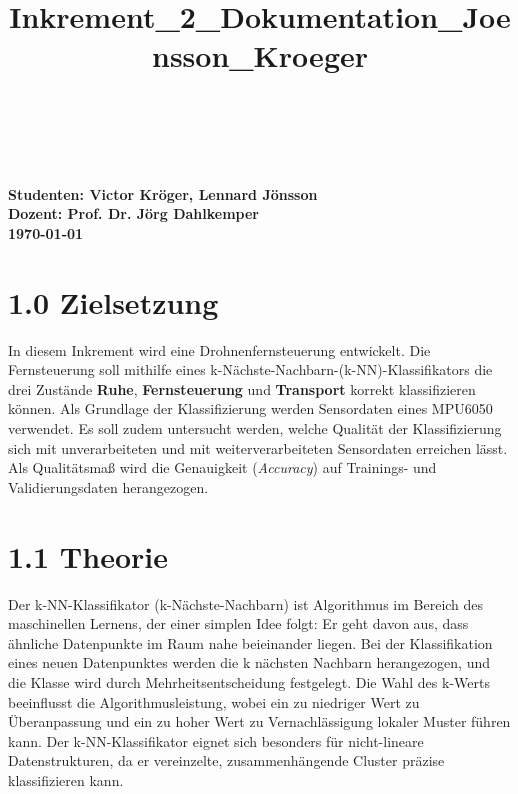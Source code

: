 \documentclass[11pt]{article}
\title{Inkrement\_2\_Dokumentation\_Joensson\_Kroeger}
\begin{document}
\thispagestyle{empty}


\vspace{6cm}

 \\
\vspace{12pt}
 \\

\vfill
\raggedright
\textbf{Studenten: Victor Kröger, Lennard Jönsson} \\
\textbf{Dozent: Prof. Dr. Jörg Dahlkemper}\\
\textbf{\today}

\newpage

    \hypertarget{zielsetzung}{%
\section*{1.0 Zielsetzung}\label{zielsetzung}}

    In diesem Inkrement wird eine Drohnenfernsteuerung entwickelt. Die
Fernsteuerung soll mithilfe eines
k-Nächste-Nachbarn-(k-NN)-Klassifikators die drei Zustände
\textbf{Ruhe}, \textbf{Fernsteuerung} und \textbf{Transport} korrekt
klassifizieren können. Als Grundlage der Klassifizierung werden
Sensordaten eines MPU6050 verwendet. Es soll zudem untersucht werden,
welche Qualität der Klassifizierung sich mit unverarbeiteten und mit
weiterverarbeiteten Sensordaten erreichen lässt. Als Qualitätsmaß wird
die Genauigkeit (\emph{Accuracy}) auf Trainings- und Validierungsdaten
herangezogen.

    \hypertarget{theorie}{%
\section*{1.1 Theorie}\label{theorie}}

Der k-NN-Klassifikator (k-Nächste-Nachbarn) ist Algorithmus im Bereich 
des maschinellen Lernens, der einer simplen Idee folgt: Er
geht davon aus, dass ähnliche Datenpunkte im Raum nahe beieinander
liegen. Bei der Klassifikation eines neuen Datenpunktes werden die k
nächsten Nachbarn herangezogen, und die Klasse wird durch
Mehrheitsentscheidung festgelegt. Die Wahl des k-Werts beeinflusst die
Algorithmusleistung, wobei ein zu niedriger Wert zu Überanpassung und
ein zu hoher Wert zu Vernachlässigung lokaler Muster führen kann. Der
k-NN-Klassifikator eignet sich besonders für nicht-lineare
Datenstrukturen, da er vereinzelte, zusammenhängende Cluster präzise
klassifizieren kann.
\end{document}
